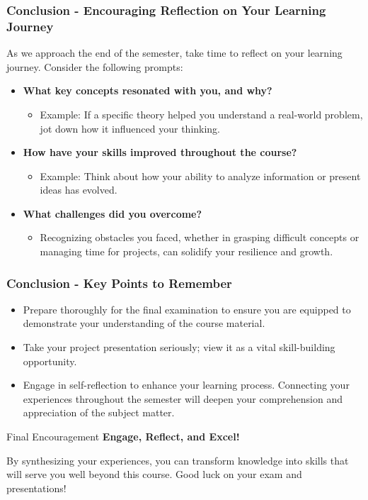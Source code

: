 \documentclass[aspectratio=169]{beamer}
\begin{document}
\begin{frame}[fragile]
    \frametitle{Conclusion - Encouraging Reflection on Your Learning Journey}
    As we approach the end of the semester, take time to reflect on your learning journey. Consider the following prompts:
    
    \begin{itemize}
        \item \textbf{What key concepts resonated with you, and why?}
        \begin{itemize}
            \item Example: If a specific theory helped you understand a real-world problem, jot down how it influenced your thinking.
        \end{itemize}
        
        \item \textbf{How have your skills improved throughout the course?}
        \begin{itemize}
            \item Example: Think about how your ability to analyze information or present ideas has evolved.
        \end{itemize}
        
        \item \textbf{What challenges did you overcome?}
        \begin{itemize}
            \item Recognizing obstacles you faced, whether in grasping difficult concepts or managing time for projects, can solidify your resilience and growth.
        \end{itemize}
    \end{itemize}
\end{frame}

\begin{frame}[fragile]
    \frametitle{Conclusion - Key Points to Remember}
    \begin{itemize}
        \item Prepare thoroughly for the final examination to ensure you are equipped to demonstrate your understanding of the course material.
        \item Take your project presentation seriously; view it as a vital skill-building opportunity.
        \item Engage in self-reflection to enhance your learning process. Connecting your experiences throughout the semester will deepen your comprehension and appreciation of the subject matter.
    \end{itemize}
    
    \begin{block}{Final Encouragement}
        \textbf{Engage, Reflect, and Excel!}
    \end{block}
    
    By synthesizing your experiences, you can transform knowledge into skills that will serve you well beyond this course. Good luck on your exam and presentations!
\end{frame}
\end{document}
